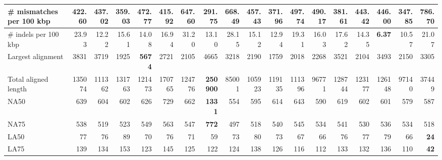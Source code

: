 \documentclass[12pt,a4paper]{article}
\begin{document}
\begin{table}[ht]
\begin{center}
\begin{tabular}{|l*{17}{|r}|}
\# mismatches per 100 kbp & 422.60 & 437.02 & 359.03 & 472.77 & 415.92 & 647.60 & {\bf 291.75} & 668.49 & 457.43 & 371.96 & 497.74 & 490.17 & 381.61 & 443.42 & 446.00 & 347.85 & 786.70 \\ \hline
\# indels per 100 kbp & 23.93 & 12.22 & 15.61 & 14.08 & 16.94 & 31.20 & 13.10 & 28.15 & 15.12 & 12.94 & 19.31 & 16.03 & 17.62 & 14.35 & {\bf 6.37} & 10.57 & 21.07 \\ \hline
Largest alignment & 3831 & 3719 & 1925 & {\bf 5674} & 2721 & 2105 & 4665 & 3218 & 2190 & 1759 & 2018 & 2268 & 3521 & 2104 & 3493 & 2150 & 3305 \\ \hline
Total aligned length & 135074 & 111362 & 131763 & 121473 & 170765 & 124776 & {\bf 250900} & 85001 & 105923 & 119135 & 111396 & 96771 & 128744 & 123177 & 126148 & 97140 & 37449 \\ \hline
NA50 & 639 & 604 & 602 & 626 & 729 & 662 & {\bf 1331} & 554 & 595 & 614 & 643 & 590 & 619 & 602 & 601 & 579 & 587 \\ \hline
NA75 & 538 & 519 & 523 & 549 & 563 & 547 & {\bf 772} & 497 & 518 & 540 & 545 & 534 & 541 & 530 & 536 & 534 & 518 \\ \hline
LA50 & 77 & 76 & 89 & 70 & 76 & 71 & 59 & 73 & 80 & 73 & 67 & 66 & 76 & 77 & 79 & 66 & {\bf 24} \\ \hline
LA75 & 139 & 134 & 153 & 123 & 145 & 125 & 122 & 124 & 138 & 126 & 116 & 112 & 133 & 132 & 136 & 110 & {\bf 42} \\ \hline
\end{tabular}
\end{center}
\end{table}
\end{document}
